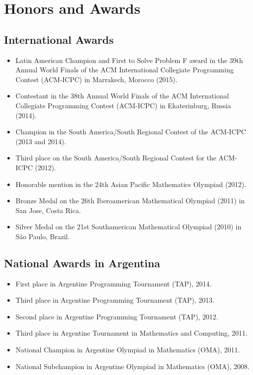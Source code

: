 \documentclass [a4paper, 11pt]{article}
\begin{document}
\section* {Honors and Awards}

\subsection* {International Awards}

\begin{itemize} \itemsep.05cm
	\item[] Latin American Champion and First to Solve Problem F award in the 39th Annual World Finals of the ACM International Collegiate Programming Contest (ACM-ICPC) in Marrakech, Morocco (2015).
	\item[] Contestant in the 38th Annual World Finals of the ACM International Collegiate Programming Contest (ACM-ICPC) in Ekaterinburg, Russia (2014).
	\item[] Champion in the South America/South Regional Contest of the ACM-ICPC (2013 and 2014).
	\item[] Third place on the South America/South Regional Contest for the ACM-ICPC (2012).
	\item[] Honorable mention in the 24th Asian Pacific Mathematics Olympiad (2012).
	\item[] Bronze Medal on the 26th Iberoamerican Mathematical Olympiad (2011) in San Jose, Costa Rica.
	\item[] Silver Medal on the 21st Southamerican Mathematical Olympiad (2010) in S\~ao Paulo, Brazil. 
\end{itemize}

\subsection* {National Awards in Argentina}

\begin{itemize} \itemsep.05cm
    \item[] First place in Argentine Programming Tournament (TAP), 2014.
	\item[] Third place in Argentine Programming Tournament (TAP), 2013.
	\item[] Second place in Argentine Programming Tournament (TAP), 2012.
	\item[] Third place in Argentine Tournament in Mathematics and Computing, 2011.
	\item[] National Champion in Argentine Olympiad in Mathematics (OMA), 2011.
	\item[] National Subchampion in Argentine Olympiad in Mathematics (OMA), 2008.
	
\end{itemize}
\end{document}
